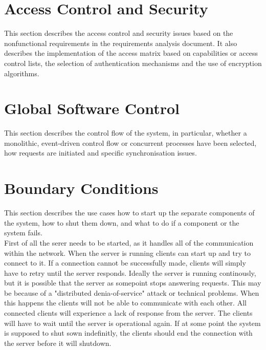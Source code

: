\documentclass[a4paper,12pt]{scrartcl}
\begin{document}
    \section{Access Control and Security}
    This section describes the access control and security issues based on the nonfunctional requirements in the requirements analysis document. It also describes the implementation of the access matrix based on capabilities or access control lists, the selection of authentication mechanisms and the use of encryption algorithms.


    \section{Global Software Control}
    This section describes the control flow of the system, in particular, whether a monolithic, event-driven control flow or concurrent processes have been selected, how requests are initiated and specific synchronisation issues.


    \section{Boundary Conditions}
    This section describes the use cases how to start up the separate components of the system, how to shut them down, and what to do if a component or the system fails. \\First of all the serer needs to be started, as it handles all of the communication within the network. When the server is running clients can start up and try to connect to it. If a connection cannot be successfully made, clients will simply have to retry until the server responds. Ideally the server is running continously, but it is possible that the server as somepoint stops answering requests. This may be because of a "distributed denia-of-service" attack or technical problems. When this happens the clients will not be able to communicate with each other. All connected clients will experience a lack of response from the server. The clients will have to wait until the server is operational again. If at some point the system is supposed to shut sown indefinitly, the clients should end the connection with the server before it will shutdown. 
\end{document}
